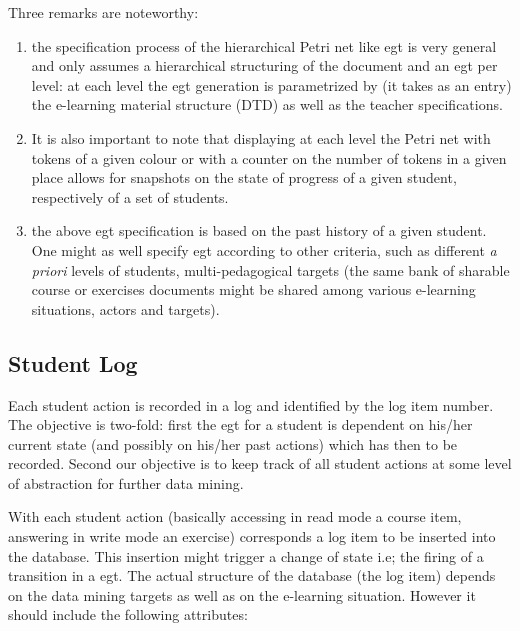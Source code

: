 Three remarks are noteworthy:

\begin{enumerate}

  \item the specification process of the hierarchical Petri net like
  egt is very general and only assumes a hierarchical structuring of
  the document and an egt per level: at each level the egt generation
  is parametrized by (it takes as an entry) the e-learning material
  structure (DTD) as well as the teacher specifications.

  \item It is also important to note that displaying at each level the
  Petri net with tokens of a given colour or with a counter on the
  number of tokens in a given place allows for snapshots on the state
  of progress of a given student, respectively of a set of students.

  \item the above egt specification is based on the past history of a
  given student. One might as well specify egt according to other
  criteria, such as different \emph{a priori} levels of students,
  multi-pedagogical targets (the same bank of sharable course or
  exercises documents might be shared among various e-learning
  situations, actors and targets).
\end{enumerate}

\subsection{Student Log}

Each student action is recorded in a log and identified by the log
item number. The objective is two-fold: first the egt for a student is
dependent on his/her current state (and possibly on his/her past
actions) which has then to be recorded. Second our objective is to
keep track of all student actions at some level of abstraction for
further data mining. 

With each student action (basically accessing in read mode a course
item, answering in write mode an exercise) corresponds a log item to
be inserted into the database. This insertion might trigger a change of
state i.e; the firing of a transition in a egt. The actual structure
of the database (the log item) depends on the data mining targets as
well as on the e-learning situation. However it should include the
following attributes:

